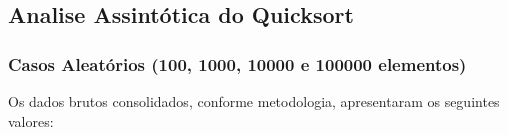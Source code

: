 \documentclass[a4paper, 12pt]{article}
\begin{document}
\subsection{Analise Assintótica do Quicksort}

\subsubsection{Casos Aleatórios (100, 1000, 10000 e 100000 elementos)}

\tab{ }Os dados brutos consolidados, conforme metodologia, apresentaram os seguintes valores:
\vspace{0.2cm}

\begin{minipage}{1.05\textwidth}
 \begin{minipage}[c]{0.46\textwidth}
 \centering 
\begin{tabular}{ccccc}


\end{tabular}
\end{minipage}
\end{minipage}
\end{document}
